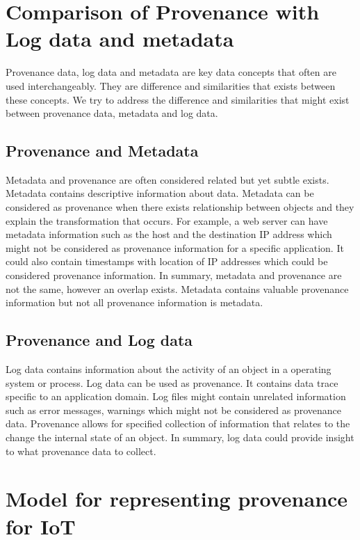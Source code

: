 \section{Comparison of Provenance with Log data and metadata}

Provenance data, log data and metadata are key data concepts that often are used interchangeably. They are difference and similarities that exists between these concepts. We try to address the difference and similarities that might exist between provenance data, metadata and log data.

\subsection{Provenance and Metadata}
Metadata and provenance are often considered related but yet subtle exists. Metadata contains descriptive information about data. Metadata can be considered as provenance when there exists relationship between objects and they explain the transformation that occurs. For example, a web server can have metadata information such as the host and the destination IP address which might not be considered as provenance information for a specific application. It could also contain timestamps with location of IP addresses which could be considered provenance information. In summary,  metadata and provenance are not the same, however an overlap exists. Metadata contains valuable  provenance information but not all provenance information is metadata. 


\subsection{Provenance and Log data}
Log data contains information about the activity of an object in a operating system or process. Log data can be used as provenance. It contains data trace specific to an application domain. Log files might contain unrelated information such as error messages, warnings which might not be considered as provenance data. Provenance allows for specified collection of information that relates to the change the internal state of an object. In summary, log data could provide insight to what provenance data to collect. 

\section{Model for representing provenance for IoT}

